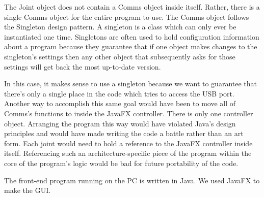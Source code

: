 The Joint object does not contain a Comms object inside itself. Rather, there is a single Comms object for the entire program to use. The Comms object follows the Singleton design pattern. A singleton is a class which can only ever be instantiated one time. Singletons are often used to hold configuration information about a program because they guarantee that if one object makes changes to the singleton's settings then any other object that subsequently asks for those settings will get back the most up-to-date version.
\noindent 

In this case, it makes sense to use a singleton because we want to guarantee that there's only a single place in the code which tries to access the USB port. Another way to accomplish this same goal would have been to move all of Comms's functions to inside the JavaFX controller. There is only one controller object. Arranging the program this way would have violated Java's design principles and would have made writing the code a battle rather than an art form. %
Each joint would need to hold a reference to the JavaFX controller inside itself. Referencing such an architecture-specific piece of the program within the core of the program's logic would be bad for future portability of the code. 
\noindent

The front-end program running on the PC is written in Java. We used JavaFX to make the GUI. 







